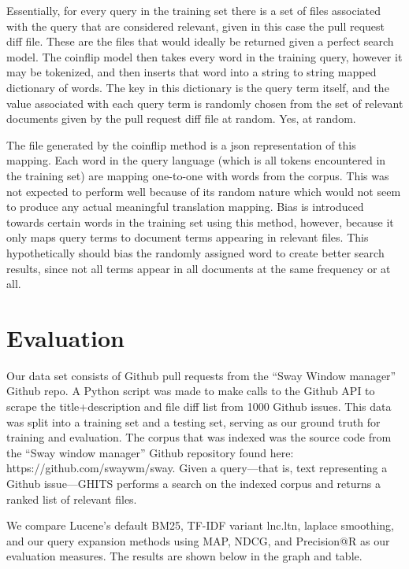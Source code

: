 \documentclass[10pt,a4paper]{article}
\begin{document}
Essentially, for every query in the training set there is a set of files
associated with the query that are considered relevant, given in this case the
pull request diff file. These are the files that would ideally be returned given
a perfect search model. The coinflip model then takes every word in the training
query, however it may be tokenized, and then inserts that word into a string to
string mapped dictionary of words. The key in this dictionary is the query term
itself, and the value associated with each query term is randomly chosen from the
set of relevant documents given by the pull request diff file at random. Yes, at
random.

The file generated by the coinflip method is a json representation of this mapping.
Each word in the query language (which is all tokens encountered in the training set)
are mapping one-to-one with words from the corpus. This was not expected to perform
well because of its random nature which would not seem to produce any
actual meaningful translation mapping. Bias is introduced towards certain words
in the training set using this method, however, because it only maps query terms
to document terms appearing in relevant files. This hypothetically should bias
the randomly assigned word to create better search results, since not all terms
appear in all documents at the same frequency or at all.

\section{Evaluation}

Our data set consists of Github pull requests from the “Sway Window manager” Github repo. A Python script was made to make calls to the Github API to scrape the title+description and file diff list from 1000 Github issues. This data was split into a training set and a testing set, serving as our ground truth for training and evaluation. The corpus that was indexed was the source code from the “Sway window manager” Github repository found here: https://github.com/swaywm/sway. Given a query—that is, text representing a Github issue—GHITS performs a search on the indexed corpus and returns a ranked list of relevant files.

We compare Lucene’s default BM25, TF-IDF variant lnc.ltn, laplace smoothing, and our query expansion methods using MAP, NDCG, and Precision@R as our evaluation measures. The results are shown below in the graph and table. 
\end{document}

